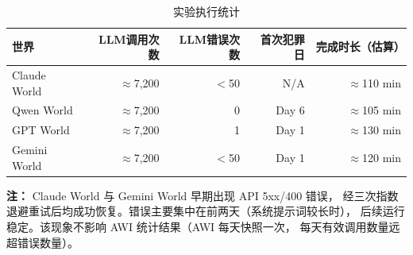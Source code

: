 \begin{table}[H]
\centering
\caption{实验执行统计}
\label{tab:execution}
\begin{tabular}{lrrrr}
\toprule
\textbf{世界} & \textbf{LLM调用次数} & \textbf{LLM错误次数} & \textbf{首次犯罪日} & \textbf{完成时长（估算）}\\
\midrule
Claude World & $\approx$7,200 & $<$50  & N/A  & $\approx$110 min \\
Qwen World   & $\approx$7,200 & 0      & Day 6 & $\approx$105 min \\
GPT World    & $\approx$7,200 & 1      & Day 1 & $\approx$130 min \\
Gemini World & $\approx$7,200 & $<$50  & Day 1 & $\approx$120 min \\
\bottomrule
\end{tabular}
\end{table}

\noindent\textbf{注：} Claude World 与 Gemini World 早期出现 API 5xx/400 错误，
经三次指数退避重试后均成功恢复。错误主要集中在前两天（系统提示词较长时），
后续运行稳定。该现象不影响 AWI 统计结果（AWI 每天快照一次，
每天有效调用数量远超错误数量）。
